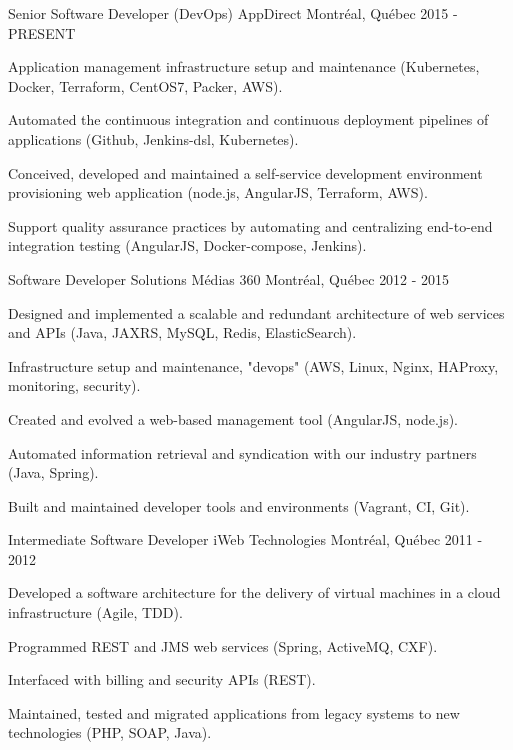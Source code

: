 
\begin{cventries}

  \cventry
    {Senior Software Developer (DevOps)} %
    {AppDirect} %
    {Montréal, Québec} %
    {2015 - PRESENT} %
    {
      \begin{cvitems} %
        \item {Application management infrastructure setup and maintenance (Kubernetes, Docker, Terraform, CentOS7, Packer, AWS).}
        \item {Automated the continuous integration and continuous deployment pipelines of applications (Github, Jenkins-dsl, Kubernetes).}
        \item {Conceived, developed and maintained a self-service development environment provisioning web application (node.js, AngularJS, Terraform, AWS).}
        \item {Support quality assurance practices by automating and centralizing end-to-end integration testing (AngularJS, Docker-compose, Jenkins).}
      \end{cvitems}
    }

  \cventry
    {Software Developer} %
    {Solutions Médias 360} %
    {Montréal, Québec} %
    {2012 - 2015} %
    {
      \begin{cvitems} %
        \item {Designed and implemented a scalable and redundant architecture of web services and APIs (Java, JAXRS, MySQL, Redis, ElasticSearch).}
        \item {Infrastructure setup and maintenance, "devops" (AWS, Linux, Nginx, HAProxy, monitoring, security).}
        \item {Created and evolved a web-based management tool (AngularJS, node.js).}
        \item {Automated information retrieval and syndication with our industry partners (Java, Spring).}
        \item {Built and maintained developer tools and environments (Vagrant, CI, Git).}
      \end{cvitems}
    }

  \cventry
    {Intermediate Software Developer} %
    {iWeb Technologies} %
    {Montréal, Québec} %
    {2011 - 2012} %
    {
      \begin{cvitems} %
        \item {Developed a software architecture for the delivery of virtual machines in a cloud infrastructure (Agile, TDD).}
        \item {Programmed REST and JMS web services (Spring, ActiveMQ, CXF).}
        \item {Interfaced with billing and security APIs (REST).}
        \item {Maintained, tested and migrated applications from legacy systems to new technologies (PHP, SOAP, Java).}
      \end{cvitems}
    }


\end{cventries}
